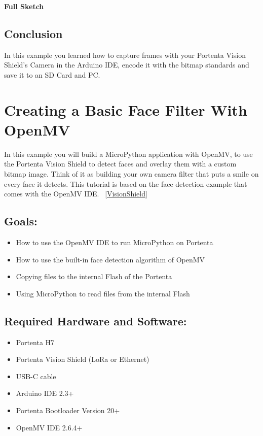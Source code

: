 \textbf{Full Sketch}

{
	\label{SaveImage}
}

\subsection{Conclusion}
In this example you learned how to capture frames with your Portenta Vision Shield's Camera in the Arduino IDE, encode it with the bitmap standards and save it to an SD Card and PC.









\section{Creating a Basic Face Filter With OpenMV}
In this example you will build a MicroPython application with OpenMV, to use the Portenta Vision Shield to detect faces and overlay them with a custom bitmap image. Think of it as building your own camera filter that puts a smile on every face it detects. This tutorial is based on the face detection example that comes with the OpenMV IDE. ~\ref{VisionShield} \cite{portentaFaceFilter:2024}

\subsection{Goals:}
\begin{itemize}
	\item How to use the OpenMV IDE to run MicroPython on Portenta
	\item How to use the built-in face detection algorithm of OpenMV
	\item Copying files to the internal Flash of the Portenta
	\item Using MicroPython to read files from the internal Flash \cite{portentaFaceFilter:2024}
\end{itemize}

\subsection{Required Hardware and Software:}
\begin{itemize}
	\item Portenta H7
	\item Portenta Vision Shield (LoRa or Ethernet)
	\item USB-C cable
	\item Arduino IDE 2.3+
	\item Portenta Bootloader Version 20+
	\item OpenMV IDE 2.6.4+ \cite{portentaFaceFilter:2024}
\end{itemize}

